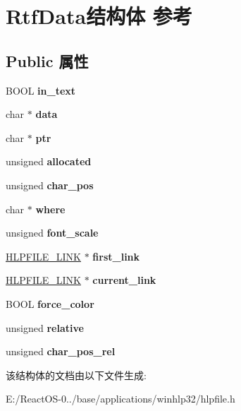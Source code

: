 \hypertarget{struct_rtf_data}{}\section{Rtf\+Data结构体 参考}
\label{struct_rtf_data}
\subsection*{Public 属性}
\begin{DoxyCompactItemize}
\item 
\mbox{\label{struct_rtf_data_a84dea68fe1e07fbba55cf96652b76a3b}} 
B\+O\+OL {\bfseries in\+\_\+text}
\item 
\mbox{\label{struct_rtf_data_a72ca1f25b340bdfb536d0146b705ff94}} 
char $\ast$ {\bfseries data}
\item 
\mbox{\label{struct_rtf_data_ad8b5031078396c83a469b562edeab204}} 
char $\ast$ {\bfseries ptr}
\item 
\mbox{\label{struct_rtf_data_af4dd7d6bf8c2eb8503d807e5d9e0b3fa}} 
unsigned {\bfseries allocated}
\item 
\mbox{\label{struct_rtf_data_a54196fdaca6d27e6f303599ae726a65e}} 
unsigned {\bfseries char\+\_\+pos}
\item 
\mbox{\label{struct_rtf_data_a104656f1f8e98924dd7aa099fc455356}} 
char $\ast$ {\bfseries where}
\item 
\mbox{\label{struct_rtf_data_a70e47e82ecf7f56bb68204becd8f2dd5}} 
unsigned {\bfseries font\+\_\+scale}
\item 
\mbox{\label{struct_rtf_data_a99be9009c7bf8a222988b0b00dcfec96}} 
\hyperlink{structtag_hlp_file_link}{H\+L\+P\+F\+I\+L\+E\+\_\+\+L\+I\+NK} $\ast$ {\bfseries first\+\_\+link}
\item 
\mbox{\label{struct_rtf_data_a6f5f04030d02fb534e68b12aae871631}} 
\hyperlink{structtag_hlp_file_link}{H\+L\+P\+F\+I\+L\+E\+\_\+\+L\+I\+NK} $\ast$ {\bfseries current\+\_\+link}
\item 
\mbox{\label{struct_rtf_data_a8395a5e42a6d7fc2a8f41e32335534a8}} 
B\+O\+OL {\bfseries force\+\_\+color}
\item 
\mbox{\label{struct_rtf_data_ae8d7e53e73a32cd62eee8ecf74bacea0}} 
unsigned {\bfseries relative}
\item 
\mbox{\label{struct_rtf_data_a3ca93677f24412fa550687db5ae32312}} 
unsigned {\bfseries char\+\_\+pos\+\_\+rel}
\end{DoxyCompactItemize}


该结构体的文档由以下文件生成\+:\begin{DoxyCompactItemize}
\item 
E\+:/\+React\+O\+S-\/0../base/applications/winhlp32/hlpfile.\+h\end{DoxyCompactItemize}

